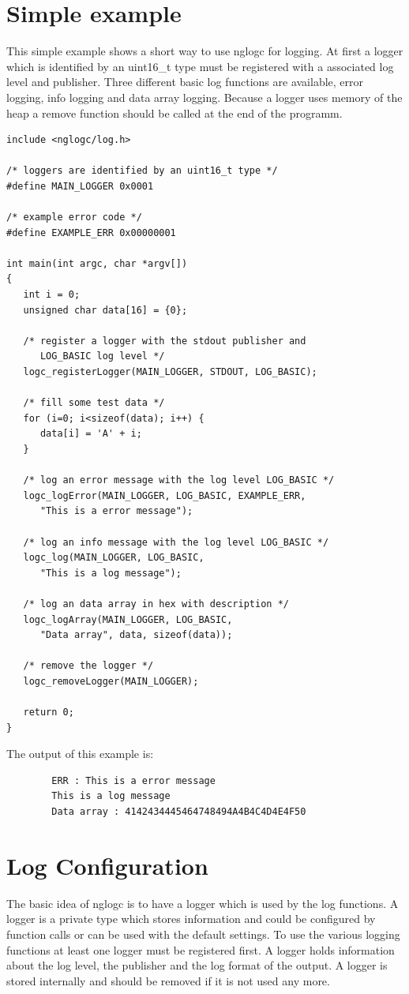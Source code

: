 \documentclass[a4paper, titlepage, 11pt]{article}
\begin{document}
\newpage

\section{Simple example}
This simple example shows a short way to use nglogc for logging.
At first a logger which is identified by an uint16\_t type must be registered with a associated log level and publisher. Three different basic log functions are available, error
logging, info logging and data array logging. Because a logger uses memory of the heap a remove function should be called at the end of the programm.\newline

\small
\begin{verbatim}
include <nglogc/log.h>

/* loggers are identified by an uint16_t type */
#define MAIN_LOGGER 0x0001

/* example error code */
#define EXAMPLE_ERR 0x00000001

int main(int argc, char *argv[])
{
   int i = 0;
   unsigned char data[16] = {0};

   /* register a logger with the stdout publisher and
      LOG_BASIC log level */
   logc_registerLogger(MAIN_LOGGER, STDOUT, LOG_BASIC);

   /* fill some test data */
   for (i=0; i<sizeof(data); i++) {
      data[i] = 'A' + i;
   }

   /* log an error message with the log level LOG_BASIC */
   logc_logError(MAIN_LOGGER, LOG_BASIC, EXAMPLE_ERR,
      "This is a error message");

   /* log an info message with the log level LOG_BASIC */
   logc_log(MAIN_LOGGER, LOG_BASIC,
      "This is a log message");

   /* log an data array in hex with description */
   logc_logArray(MAIN_LOGGER, LOG_BASIC,
      "Data array", data, sizeof(data));

   /* remove the logger */
   logc_removeLogger(MAIN_LOGGER);

   return 0;
}
\end{verbatim}
\normalsize
The output of this example is:
\small
\begin{verbatim}
        ERR : This is a error message
        This is a log message
        Data array : 4142434445464748494A4B4C4D4E4F50
\end{verbatim}
\normalsize
\normalsize

\section{Log Configuration}
The basic idea of nglogc is to have a logger which is used by the log functions. A logger is a private type which stores information and could be configured by function calls or can be used with the default settings. To use the various logging functions at least one logger must be registered first. A logger holds information about the log level, the publisher and the log format of the output. A logger is stored internally and should be removed if it is not used any more.
\end{document}
